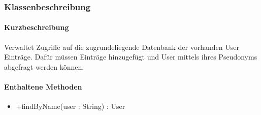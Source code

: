 \subsubsection*{Klassenbeschreibung}%
\paragraph*{Kurzbeschreibung}
Verwaltet Zugriffe auf die zugrundeliegende Datenbank der vorhanden User Einträge.
Dafür müssen Einträge hinzugefügt und User mittels ihres Pseudonyms abgefragt werden können.
\paragraph*{Enthaltene Methoden}
\begin{itemize}
    \item +findByName(user : String) : User
\end{itemize}
